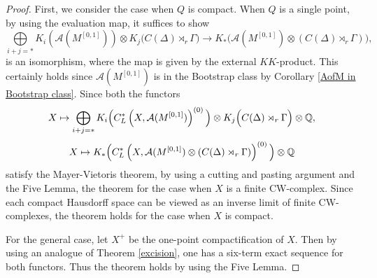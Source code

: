 \documentclass[11pt]{article}
\theoremstyle{definition}
\theoremstyle{plain}
\def\A{\mathcal A}\def\C{\mathcal C}\def\B{\mathcal B}\def\E{\mathcal E}\def\O{\mathcal O}\def\h{\mathfrak h}\def\K{\mathcal K}\def\F{\mathcal F}\def\P{\mathcal P}\def\L{\mathcal L}\def\R{\mathcal R}\def\Q{\mathcal Q}\def\H{\mathcal H}\def\S{\mathcal S}\def\N{\mathcal N}\def\U{\mathcal U}\def\V{\mathcal V}
\def\ox{\otimes}
\def\ox{\otimes}
\def\Ga{\Gamma}
\begin{document}
\begin{proof}
First, we consider the case when $Q$ is compact. When $Q$ is a single point, by using the evaluation map, it suffices to show
$$\bigoplus\limits_{i+j=*} K_{i}\left(\mathcal{A}(M^{[0,1]})\right) \otimes K_{j} \Big( C(\Delta) \rtimes_r \Gamma  \Big)\to K_*\Big(\A(M^{[0,1]})\ox(C(\Delta)\rtimes_r\Ga)\Big),$$
is an isomorphism, where the map is given by the external $KK$-product. This certainly holds since $\A(M^{[0,1]})$ is in the Bootstrap class by Corollary \ref{AofM in Bootstrap class}. Since both the functors
$$X\mapsto \bigoplus\limits_{i+j=*} K_{i}\Big( C_L^*\left(X,\mathcal{A}(M^{[0,1]}) \right)^{(0)} \Big) \otimes K_{j} \Big( C(\Delta) \rtimes_r \Gamma  \Big)\ox\IQ,$$
$$X\mapsto K_*\Big(C^*_L\left(X,\A(M^{[0,1]})\ox(C(\Delta)\rtimes_r\Ga)\right)^{(0)}\Big)\ox\IQ$$
satisfy the Mayer-Vietoris theorem, by using a cutting and pasting argument and the Five Lemma, the theorem for the case when $X$ is a finite CW-complex. Since each compact Hausdorff space can be viewed as an inverse limit of finite CW-complexes, the theorem holds for the case when $X$ is compact.

For the general case, let $X^+$ be the one-point compactification of $X$. Then by using an analogue of Theorem \ref{excision}, one has a six-term exact sequence for both functors. Thus the theorem holds by using the Five Lemma.
\end{proof}
\end{document}
